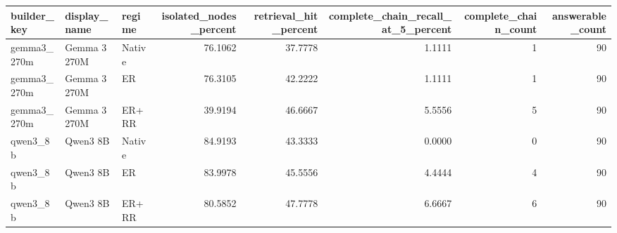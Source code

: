 \begin{tabular}{lllrrrrr}
\toprule
builder_key & display_name & regime & isolated_nodes_percent & retrieval_hit_percent & complete_chain_recall_at_5_percent & complete_chain_count & answerable_count \\
\midrule
gemma3_270m & Gemma 3 270M & Native & 76.1062 & 37.7778 & 1.1111 & 1 & 90 \\
gemma3_270m & Gemma 3 270M & ER & 76.3105 & 42.2222 & 1.1111 & 1 & 90 \\
gemma3_270m & Gemma 3 270M & ER+RR & 39.9194 & 46.6667 & 5.5556 & 5 & 90 \\
qwen3_8b & Qwen3 8B & Native & 84.9193 & 43.3333 & 0.0000 & 0 & 90 \\
qwen3_8b & Qwen3 8B & ER & 83.9978 & 45.5556 & 4.4444 & 4 & 90 \\
qwen3_8b & Qwen3 8B & ER+RR & 80.5852 & 47.7778 & 6.6667 & 6 & 90 \\
\bottomrule
\end{tabular}
